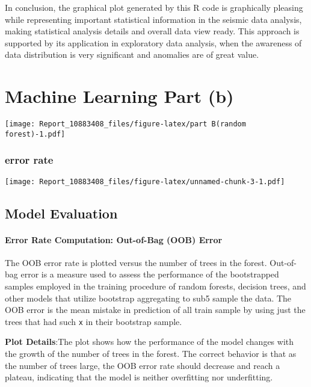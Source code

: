 \documentclass[
]{article}
\begin{document}
In conclusion, the graphical plot generated by this R code is
graphically pleasing while representing important statistical
information in the seismic data analysis, making statistical analysis
details and overall data view ready. This approach is supported by its
application in exploratory data analysis, when the awareness of data
distribution is very significant and anomalies are of great value.

\section{Machine Learning Part (b)}\label{machine-learning-part-b}

\texttt{[image: Report\_10883408\_files/figure-latex/part B(random forest)-1.pdf]}

\subsubsection{error rate}\label{error-rate}

\texttt{[image: Report\_10883408\_files/figure-latex/unnamed-chunk-3-1.pdf]}

\subsection{Model Evaluation}\label{model-evaluation}

\paragraph{Error Rate Computation: Out-of-Bag (OOB)
Error}\label{error-rate-computation-out-of-bag-oob-error}

The OOB error rate is plotted versus the number of trees in the forest.
Out-of-bag error is a measure used to assess the performance of the
bootstrapped samples employed in the training procedure of random
forests, decision trees, and other models that utilize bootstrap
aggregating to sub5 sample the data. The OOB error is the mean mistake
in prediction of all train sample by using just the trees that had such
\texttt{x} in their bootstrap sample.

\textbf{Plot Details}:The plot shows how the performance of the model
changes with the growth of the number of trees in the forest. The
correct behavior is that as the number of trees large, the OOB error
rate should decrease and reach a plateau, indicating that the model is
neither overfitting nor underfitting.
\end{document}
